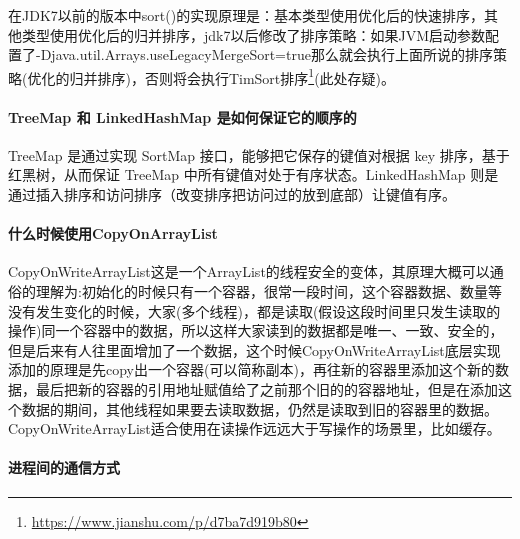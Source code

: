 \documentclass[../../../interview-questions.tex]{subfiles}
\begin{document}
在JDK7以前的版本中sort()的实现原理是：基本类型使用优化后的快速排序，其他类型使用优化后的归并排序，jdk7以后修改了排序策略：如果JVM启动参数配置了-Djava.util.Arrays.useLegacyMergeSort=true那么就会执行上面所说的排序策略(优化的归并排序)，否则将会执行TimSort排序\footnote{\url{https://www.jianshu.com/p/d7ba7d919b80}}(此处存疑)。

\paragraph{TreeMap 和 LinkedHashMap 是如何保证它的顺序的}

TreeMap 是通过实现 SortMap 接口，能够把它保存的键值对根据 key 排序，基于红黑树，从而保证 TreeMap 中所有键值对处于有序状态。LinkedHashMap 则是通过插入排序和访问排序（改变排序把访问过的放到底部）让键值有序。

\paragraph{什么时候使用CopyOnArrayList}

CopyOnWriteArrayList这是一个ArrayList的线程安全的变体，其原理大概可以通俗的理解为:初始化的时候只有一个容器，很常一段时间，这个容器数据、数量等没有发生变化的时候，大家(多个线程)，都是读取(假设这段时间里只发生读取的操作)同一个容器中的数据，所以这样大家读到的数据都是唯一、一致、安全的，但是后来有人往里面增加了一个数据，这个时候CopyOnWriteArrayList底层实现添加的原理是先copy出一个容器(可以简称副本)，再往新的容器里添加这个新的数据，最后把新的容器的引用地址赋值给了之前那个旧的的容器地址，但是在添加这个数据的期间，其他线程如果要去读取数据，仍然是读取到旧的容器里的数据。CopyOnWriteArrayList适合使用在读操作远远大于写操作的场景里，比如缓存。

\paragraph{进程间的通信方式}
\end{document}
